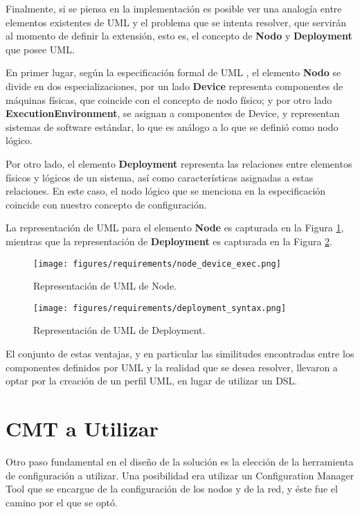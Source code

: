 Finalmente, si se piensa en la implementación es posible ver una analogía entre elementos existentes de UML y el problema que se intenta resolver, que servirán al momento de definir la extensión, esto es, el concepto de \textbf{Nodo} y \textbf{Deployment} que posee UML. 

En primer lugar, según la especificación formal de UML \cite{UML}, el elemento \textbf{Nodo} se divide en dos especializaciones, por un lado \textbf{Device} representa componentes de máquinas físicas, que coincide con el concepto de nodo físico; y por otro lado \textbf{ExecutionEnvironment}, se asignan a componentes de Device, y representan sistemas de software estándar, lo que es análogo a lo que se definió como nodo lógico. 

Por otro lado, el elemento \textbf{Deployment} representa las relaciones entre elementos físicos y lógicos de un sistema, así como características asignadas a estas relaciones. En este caso, el nodo lógico que se menciona en la especificación coincide con nuestro concepto de configuración.

La representación de UML para el elemento \textbf{Node} es capturada en la Figura \ref{fig:requirements:uml_node}, mientras que la representación de \textbf{Deployment} es capturada en la Figura \ref{fig:requirements:uml_deployment}.

\begin{figure}[H]
    \centering
    \texttt{[image: figures/requirements/node\_device\_exec.png]}
    \caption{Representación de UML de Node.}
    \label{fig:requirements:uml_node}
\end{figure}

\begin{figure}[H]
    \centering
    \texttt{[image: figures/requirements/deployment\_syntax.png]}
    \caption{Representación de UML de Deployment.}
    \label{fig:requirements:uml_deployment}
\end{figure}


El conjunto de estas ventajas, y en particular las similitudes encontradas entre los componentes definidos por UML y la realidad que se desea resolver, llevaron a optar por la creación de un perfil UML, en lugar de utilizar un DSL.

\section{CMT a Utilizar}

Otro paso fundamental en el diseño de la solución es la elección de la herramienta de configuración a utilizar. Una posibilidad era utilizar un Configuration Manager Tool que se encargue de la configuración de los nodos y de la red, y éste fue el camino por el que se optó. 

